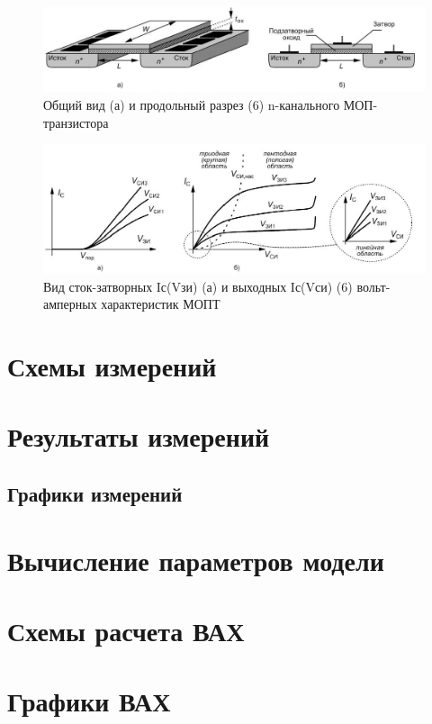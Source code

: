 \documentclass[a4paper,14pt]{article}
\begin{document}
\begin{figure}
	\centering
	\includegraphics[width=\linewidth]{image/Teor_MOP_3}
	\caption{Общий вид (а) и продольный разрез (6) n-канального МОП-транзистора}
	\label{fig:teormop3}
\end{figure}

\begin{figure}
	\centering
	\includegraphics[width=\linewidth]{image/Teor_MOP_4}
	\caption{Вид сток-затворных Iс(Vзи) (а) и выходных Iс(Vси) (6) вольт- амперных характеристик МОПТ}
	\label{fig:teormop4}
\end{figure}

\section{Схемы измерений}

\section{Результаты измерений}
\subsection{Графики измерений}
\section{Вычисление параметров модели}
\section{Схемы расчета ВАХ}
\section{Графики ВАХ}
\end{document}
